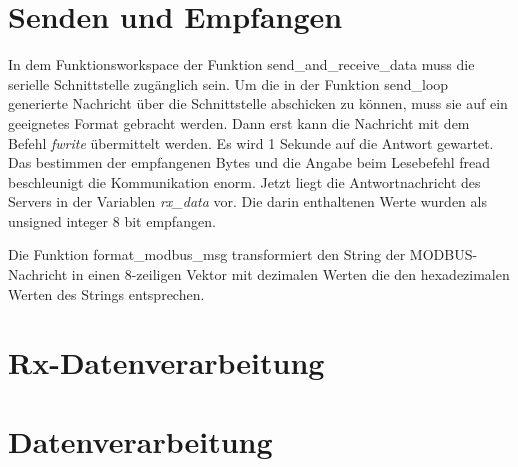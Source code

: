 \section{Senden und Empfangen}

In dem Funktionsworkspace der Funktion \textsf{send\_and\_receive\_data} muss die serielle Schnittstelle zugänglich sein. Um die in der Funktion \textsf{send\_loop} generierte Nachricht über die Schnittstelle abschicken zu können, muss sie auf ein geeignetes Format gebracht werden. Dann erst kann die Nachricht mit dem Befehl \textit{fwrite} übermittelt werden. Es wird 1 Sekunde auf die Antwort gewartet. Das bestimmen der empfangenen Bytes und die Angabe beim Lesebefehl \textsf{fread} beschleunigt die Kommunikation enorm. Jetzt liegt die Antwortnachricht des Servers in der Variablen \textit{rx\_data} vor. Die darin enthaltenen Werte wurden als unsigned integer 8 bit empfangen.      

Die Funktion \textsf{format\_modbus\_msg} transformiert den String der MODBUS-Nachricht in einen 8-zeiligen Vektor mit dezimalen Werten die den hexadezimalen Werten des Strings entsprechen. 
\section{Rx-Datenverarbeitung}

\section{Datenverarbeitung}
        
